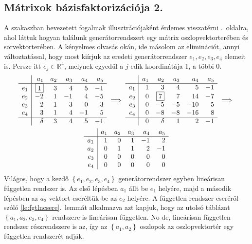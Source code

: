 \documentclass[9pt, a4paper, showtrims]{memoir}
\theoremstyle{plain}
\theoremstyle{remark}
\theoremstyle{definition}
\begin{document}
\subsection{Mátrixok bázisfaktorizációja 2.}
A szakaszban bevezetett fogalmak illusztrációjaként érdemes visszatérni .~oldalra,
ahol láttuk hogyan találunk generátorrendszert egy mátrix oszlopvektorterében és sorvektorterében.
A kényelmes olvasás okán, ide másolom az eliminációt, annyi változtatással, hogy 
most kiírjuk az eredeti generátorrendszer $e_1,e_2,e_3,e_4$ elemeit is.
Persze itt $e_j\in\mathbb{R}^4$, melynek egyedül a $j$-edik koordinátája 1, a többi 0.
\begin{multline*}
    \begin{array}{r|rrrrr}
         & a_1       & a_2 & a_3 & a_4 & a_5 \\
        \hline
      e_1   & \boxed{1} & 3   & 4   & 5   & -1  \\
      e_2   & -2        & 1   & -1  & 4   & -5  \\
      e_3   & 2         & 1   & 3   & 0   & 3   \\
      e_4   & 3         & 1   & 4   & -1  & 5   \\
        \hline
         & \delta    & 3   & 4   & 5   & -1
    \end{array}
    \implies
    \begin{array}{r|rrrrr}
            & a_1 & a_2       & a_3 & a_4 & a_5 \\
        \hline
        a_1 & 1   & 3         & 4   & 5   & -1  \\
        e_2 & 0   & \boxed{7} & 7   & 14  & -7  \\
        e_3 & 0   & -5        & -5  & -10 & 5   \\
        e_4 & 0   & -8        & -8  & -16 & 8   \\
        \hline
            & 0   & \delta    & 1   & 2   & -1
    \end{array}
    \implies
    \\
    \begin{array}{r|rrrrr}
            & a_1 & a_2 & a_3 & a_4 & a_5 \\
        \hline
        a_1 & 1   & 0   & 1   & -1  & 2   \\
        a_2 & 0   & 1   & 1   & 2   & -1  \\
        e_3 & 0   & 0   & 0   & 0   & 0   \\
        e_4 & 0   & 0   & 0   & 0   & 0
    \end{array}
\end{multline*}
Világos, hogy a kezdő $\left\{ e_1,e_2,e_3,e_4 \right\}$
generátorrendszer egyben lineárisan független rendszer is.
Az első lépésben $a_1$ állt be $e_1$ helyére, 
majd a második lépésben az $a_2$ vektort cseréltük be az $e_2$ helyére.
A független rendszer cseréről szóló \ref{le:fgtlncsere}.~lemmát alkalmazva azt kapjuk, hogy az utolsó táblázat $\left\{ a_1,a_2,e_3,e_4 \right\}$ rendszere is lineárisan független.
No de, lineárisan független rendszer részrendszere is az, 
így az $\left\{ a_1,a_2 \right\}$ oszlopok az oszlopvektortér egy független rendszerét adják.
\end{document}
